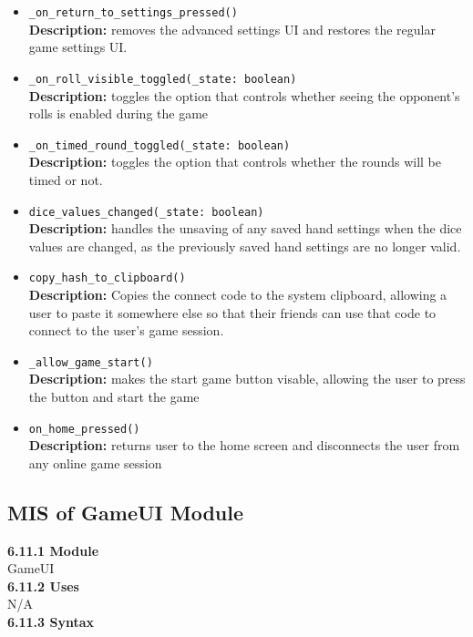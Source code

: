 \documentclass[12pt, titlepage]{article}
\begin{document}
\begin{itemize}
	\item \texttt{\_on\_return\_to\_settings\_pressed() }\\
	\textbf{Description:} removes the advanced settings UI and restores the regular game settings UI.
	\item \texttt{\_on\_roll\_visible\_toggled(\_state: boolean) }\\
	\textbf{Description:} toggles the option that controls whether seeing the opponent's rolls is enabled during the game 
	\item \texttt{\_on\_timed\_round\_toggled(\_state: boolean) }\\
	\textbf{Description:} toggles the option that controls whether the rounds will be timed or not.
	\item \texttt{dice\_values\_changed(\_state: boolean) }\\
	\textbf{Description:} handles the unsaving of any saved hand settings when the dice values are changed, as the previously saved hand settings are no longer valid.
	\item \texttt{copy\_hash\_to\_clipboard() }\\
	\textbf{Description:} Copies the connect code to the system clipboard, allowing a user to paste it somewhere else so that their friends can use that code to connect to the user's game session.
	\item \texttt{\_allow\_game\_start() }\\
	\textbf{Description:} makes the start game button visable, allowing the user to press the button and start the game
	\item \texttt{on\_home\_pressed() }\\
	\textbf{Description:} returns user to the home screen and disconnects the user from any online game session
	 
	
	
\end{itemize}

\subsection{MIS of GameUI Module}
\textbf{6.11.1 Module}\\
 GameUI\\

\noindent \textbf{6.11.2 Uses}\\
N/A \\

\noindent \textbf{6.11.3 Syntax}
\end{document}
